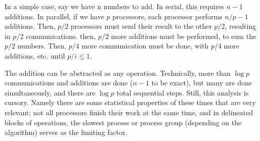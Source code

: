 \documentclass[pageno]{jpaper}
\begin{document}
In a simple case, say we have n numbers to add. In serial, this requires $n-1$
additions. In parallel, if we have $p$ processors, each processor performs
$n/p - 1$ additions. Then, $p/2$ processors must send their result to the other
$p/2$, resulting in $p/2$ communications. then, $p/2$ more additions must be
performed, to sum the $p/2$ numbers. Then, $p/4$ more communication must be done,
with $p/4$ more additions, etc. until $p/i \leq 1$.

The addition can be abstracted as any operation. Technically, more than
$\log{p}$ communications and additions are done ($n-1$ to be exact), but many
are done simultaneously, and there are $\log{p}$ total sequential steps. Still,
this analysis is cursory. Namely there are some statistical properties of these
times that are very relevant; not all processors finish their work at the same
time, and in delineated blocks of operations, the slowest process or process
group (depending on the algorithm) serves as the limiting factor.
\end{document}
